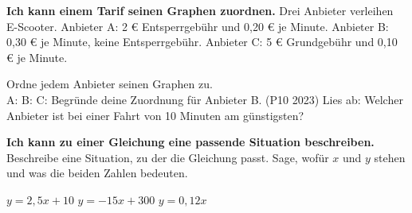 \begin{aufgabe}{\textbf{Ich kann einem Tarif seinen Graphen zuordnen.} Drei Anbieter verleihen E-Scooter. Anbieter A: 2 € Entsperrgebühr und 0,20 € je Minute. Anbieter B: 0,30 € je Minute, keine Entsperrgebühr. Anbieter C: 5 € Grundgebühr und 0,10 € je Minute.}

\begin{ksys}[xmin=0,xmax=40,ymin=0,ymax=12,xstep=5,ystep=1,xlabel=$x$ in min,ylabel=$y$ in €,ablesen]
\end{ksys}

\begin{teile}
\teil Ordne jedem Anbieter seinen Graphen zu. \\ A: \leerfeld \quad B: \leerfeld \quad C: \leerfeld
\teil Begründe deine Zuordnung für Anbieter B. (P10 2023)
\teil Lies ab: Welcher Anbieter ist bei einer Fahrt von 10 Minuten am günstigsten?
\end{teile}
\end{aufgabe}

\begin{aufgabe}{\textbf{Ich kann zu einer Gleichung eine passende Situation beschreiben.} Beschreibe eine Situation, zu der die Gleichung passt. Sage, wofür $x$ und $y$ stehen und was die beiden Zahlen bedeuten.}
\begin{teile}
\teil $y = 2{,}5x + 10$
\teil $y = -15x + 300$
\teil $y = 0{,}12x$
\end{teile}
\end{aufgabe}
